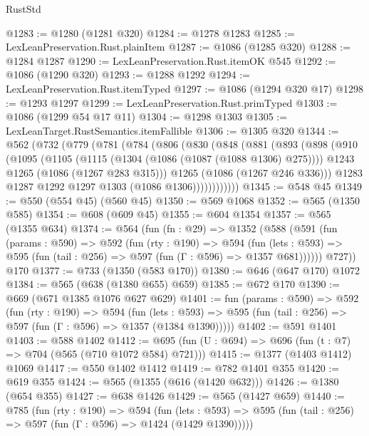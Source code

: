 \begin{lexlean}{RustStd}
\begin{coremodule}
@1283 := @1280 (@1281 @320)
@1284 := @1278 @1283
@1285 := LexLeanPreservation.Rust.plainItem
@1287 := @1086 (@1285 @320)
@1288 := @1284 @1287
@1290 := LexLeanPreservation.Rust.itemOK @545
@1292 := @1086 (@1290 @320)
@1293 := @1288 @1292
@1294 := LexLeanPreservation.Rust.itemTyped
@1297 := @1086 (@1294 @320 @17)
@1298 := @1293 @1297
@1299 := LexLeanPreservation.Rust.primTyped
@1303 := @1086 (@1299 @54 @17 @11)
@1304 := @1298 @1303
@1305 := LexLeanTarget.RustSemantics.itemFallible
@1306 := @1305 @320
@1344 := @562
    (@732
      (@779
        (@781
          (@784
            (@806
              (@830
                (@848
                  (@881
                    (@893
                      (@898
                        (@910
                          (@1095
                            (@1105
                              (@1115 (@1304 (@1086 (@1087 (@1088 @1306) @275))))
                              @1243
                              @1265
                              (@1086 (@1267 @283 @315)))
                            @1265
                            (@1086 (@1267 @246 @336)))
                          @1283
                          @1287
                          @1292
                          @1297
                          @1303
                          (@1086 @1306))))))))))))
@1345 := @548 @45
@1349 := @550 (@554 @45) (@560 @45)
@1350 := @569 @1068
@1352 := @565 (@1350 @585)
@1354 := @608 (@609 @45)
@1355 := @604 @1354
@1357 := @565 (@1355 @634)
@1374 := @564
    (fun (fn : @29) =>
    @1352
      (@588
        (@591
          (fun (params : @590) =>
          @592
            (fun (rty : @190) =>
            @594
              (fun (lets : @593) =>
              @595 (fun (tail : @256) => @597 (fun (Γ : @596) => @1357 @681))))))
        @727))
    @170
@1377 := @733 (@1350 (@583 @170))
@1380 := @646 (@647 @170) @1072
@1384 := @565 (@638 (@1380 @655) @659)
@1385 := @672 @170
@1390 := @669 (@671 @1385 @1076 @627 @629)
@1401 := fun (params : @590) =>
  @592
    (fun (rty : @190) =>
    @594
      (fun (lets : @593) =>
      @595 (fun (tail : @256) => @597 (fun (Γ : @596) => @1357 (@1384 @1390)))))
@1402 := @591 @1401
@1403 := @588 @1402
@1412 := @695 (fun (U : @694) => @696 (fun (t : @7) => @704 (@565 (@710 @1072 @584) @721)))
@1415 := @1377 (@1403 @1412) @1069
@1417 := @550 @1402 @1412
@1419 := @782 @1401 @355
@1420 := @619 @355
@1424 := @565 (@1355 (@616 (@1420 @632)))
@1426 := @1380 (@654 @355)
@1427 := @638 @1426
@1429 := @565 (@1427 @659)
@1440 := @785
    (fun (rty : @190) =>
    @594
      (fun (lets : @593) =>
      @595 (fun (tail : @256) => @597 (fun (Γ : @596) => @1424 (@1429 @1390)))))

\end{coremodule}
\end{lexlean}
